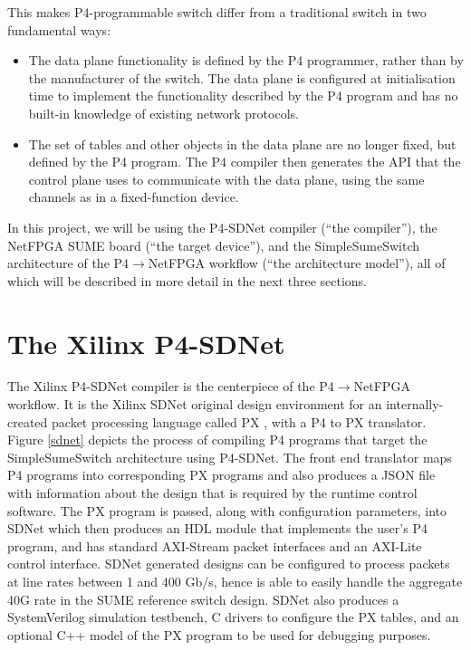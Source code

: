 This makes P4-programmable switch differ from a traditional switch in two fundamental ways:
\begin{itemize}
	\item The data plane functionality is defined by the P4 programmer, rather than by the manufacturer of the switch. The data plane is configured at initialisation time to implement the functionality described by the P4 program and has no built-in knowledge of existing network protocols.
	\item The set of tables and other objects in the data plane are no longer fixed, but defined by the P4 program. The P4 compiler then generates the API that the control plane uses to communicate with the data plane, using the same channels as in a fixed-function device.
\end{itemize}

In this project, we will be using the P4-SDNet compiler (``the compiler''), the NetFPGA SUME board (``the target device''), and the SimpleSumeSwitch architecture of the P4$\rightarrow$NetFPGA workflow (``the architecture model''), all of which will be described in more detail in the next three sections.

\section{The Xilinx P4-SDNet}
The Xilinx P4-SDNet compiler is the centerpiece of the P4$\rightarrow$NetFPGA workflow. It is the Xilinx SDNet original design environment for an internally-created packet processing language called PX \cite{px}, with a P4 to PX translator. Figure \ref{sdnet} depicts the process of compiling P4 programs that target the SimpleSumeSwitch architecture using P4-SDNet. The front end translator maps P4 programs into corresponding PX programs and also produces a JSON file with information about the design that is required by the runtime control software. The PX program is passed, along with configuration parameters, into SDNet which then produces an HDL module that implements the user’s P4 program, and has standard AXI-Stream packet interfaces and an AXI-Lite control interface. SDNet generated designs can be configured to process packets at line rates between 1 and 400 Gb/s, hence is able to easily handle the aggregate 40G rate in the SUME reference switch design. SDNet also produces a SystemVerilog simulation testbench, C drivers to configure the PX tables, and an optional C++ model of the PX program to be used for debugging purposes.

